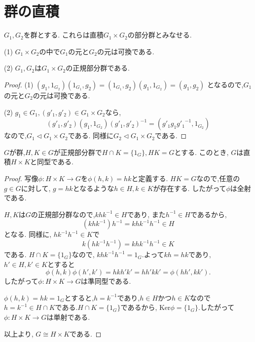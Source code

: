\section*{群の直積}
$G_1, G_2$を群とする. これらは直積$G_1\times G_2$の部分群とみなせる.
\begin{tcolorbox}
	\begin{prp*}
		(1) $G_1\times G_2$の中で$G_1$の元と$G_2$の元は可換である.

		(2) $G_1, G_2$は$G_1\times G_2$の正規部分群である.
	\end{prp*}
\end{tcolorbox}

\begin{proof}
	(1) $(g_1, 1_{G_2})(1_{G_1},g_2)=(1_{G_1},g_2)(g_1,1_{G_2})=(g_1,g_2)$
	となるので,$G_1$の元と$G_2$の元は可換である.

	(2) $g_1 \in G_1, (g'_1, g'_2)\in G_1\times G_2$なら,
	\[ (g'_1, g'_2)(g_1,1_{G_2})(g'_1,g'_2)^{-1}
	=(g'_1 g_1 {g'_1}^{-1},1_{G_2})\]
	なので,$G_1 \lhd G_1 \times G_2$である.
	同様に$G_2 \lhd G_1 \times G_2$である.
\end{proof}

\begin{tcolorbox}
	\begin{prp*}
		$G$が群,$H,K\in G$が正規部分群で$H\cap K=\{1_G\}, HK=G$とする.
		このとき, $G$は直積$H\times K$と同型である.
	\end{prp*}
\end{tcolorbox}
\begin{proof}
  写像$\phi:H\times K\to G$を$\phi(h,k)=hk$と定義する.
  $HK=G$なので,任意の$g\in G$に対して, $g=hk$となるような$h\in H, k\in K$が存在する.
  したがって$\phi$は全射である.
  
  $H,K$は$G$の正規部分群なので,$khk^{-1}\in H$であり, また$h^{-1}\in H$であるから,
  \[(khk^{-1})h^{-1}=khk^{-1}h^{-1}\in H\]
  となる.
  同様に, $hk^{-1}h^{-1}\in K$で
  \[k(hk^{-1}h^{-1})=khk^{-1}h^{-1}\in K\]
  である.
  $H\cap K=\{1_G\}$なので, $khk^{-1}h^{-1}=1_G$.よって$kh=hk$であり,
  $h'\in H, k'\in K$とすると
  \[ \phi(h,k)\phi(h',k')=hkh'k'=hh'kk'=\phi(hh',kk').\]
  したがって$\phi:H\times K\to G$は準同型である.

  $\phi(h,k)=hk=1_G$とすると,$h=k^{-1}$であり,$h\in H$かつ$h\in K$なので
  $h=k^{-1}\in H\cap K$である.$H\cap K=\{1_G\}$であるから,
  $\mathrm{Ker}\phi = \{1_G\}$.したがって$\phi: H\times K\to G$は単射である.

  以上より, $G\cong H\times K$である.
\end{proof}

